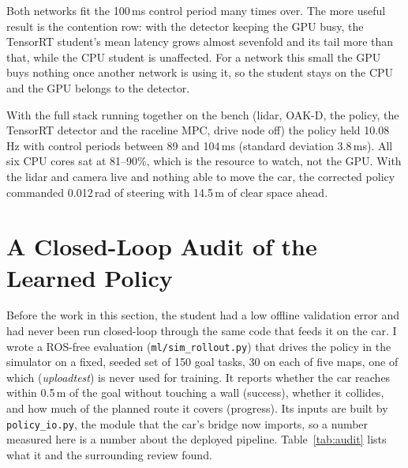 \documentclass[12pt]{article}
\begin{document}
Both networks fit the 100\,ms control period many times over. The more useful result is the
contention row: with the detector keeping the GPU busy, the TensorRT student's mean latency grows
almost sevenfold and its tail more than that, while the CPU student is unaffected. For a network
this small the GPU buys nothing once another network is using it, so the student stays on the
CPU and the GPU belongs to the detector.

With the full stack running together on the bench (lidar, OAK-D, the policy, the TensorRT
detector and the raceline MPC, drive node off) the policy held 10.08\,Hz with control periods
between 89 and 104\,ms (standard deviation 3.8\,ms). All six CPU cores sat at 81--90\%, which is
the resource to watch, not the GPU. With the lidar and camera live and nothing able to move the
car, the corrected policy commanded 0.012\,rad of steering with 14.5\,m of clear space ahead.

\section*{A Closed-Loop Audit of the Learned Policy}
\label{sec:audit}

Before the work in this section, the student had a low offline validation error and had never
been run closed-loop through the same code that feeds it on the car. I wrote a ROS-free
evaluation (\texttt{ml/sim\_rollout.py}) that drives the policy in the simulator on a fixed,
seeded set of 150 goal tasks, 30 on each of five maps, one of which (\emph{uploadtest}) is
never used for training. It reports whether the car reaches within 0.5\,m of the goal without
touching a wall (success), whether it collides, and how much of the planned route it covers
(progress). Its inputs are built by \texttt{policy\_io.py}, the module that the car's bridge now
imports, so a number measured here is a number about the deployed pipeline. Table~\ref{tab:audit}
lists what it and the surrounding review found.
\end{document}

